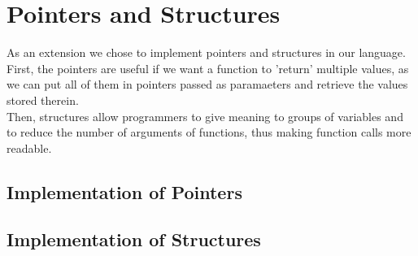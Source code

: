 \documentclass{article}
\begin{document}
\section{Pointers and Structures}
As an extension we chose to implement pointers and structures in our language. First, the pointers are useful
if we want a function to 'return' multiple values, as we can put all of them in pointers passed as paramaeters and retrieve the values stored therein.\\
Then, structures allow programmers to give meaning to groups of variables and to reduce the number of arguments of functions, thus making function calls more readable. 

\subsection{Implementation of Pointers}
\subsection{Implementation of Structures}
\end{document}
